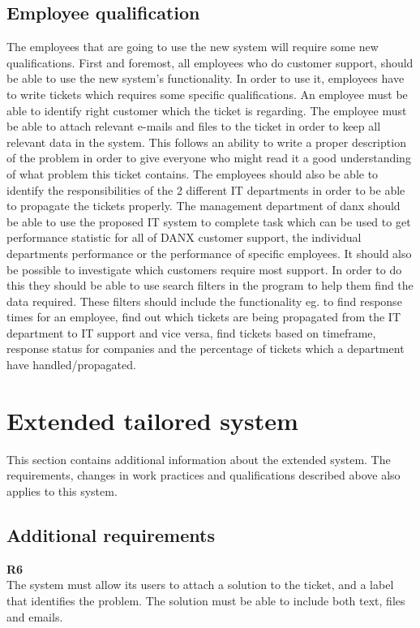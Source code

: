 \subsection{Employee qualification}
The employees that are going to use the new system will require some new qualifications. First and foremost, all employees who do customer support, should be able to use the new system's functionality. In order to use it, employees have to write tickets which requires some specific qualifications. An employee must be able to identify right customer which the ticket is regarding. The employee must be able to attach relevant e-mails and files to the ticket in order to keep all relevant data in the system. This follows an ability to write a proper description of the problem in order to give everyone who might read it a good understanding of what problem this ticket contains. The employees should also be able to identify the responsibilities of the 2 different IT departments in order to be able to propagate the tickets properly.
The management department of danx should be able to use the proposed IT system to complete task which can be used to get performance statistic for all of DANX customer support, the individual departments performance or the performance of specific employees. It should also be possible to investigate which customers require most support.
In order to do this they should be able to use search filters in the program to help them find the data required. These filters should include the functionality eg. to find response times for an employee, find out which tickets are being propagated from the IT department to IT support and vice versa, find tickets based on timeframe, response status for companies and the percentage of tickets which a department have handled/propagated.


\section{Extended tailored system}
This section contains additional information about the extended system. The requirements, changes in work practices and qualifications described above also applies to this system.
\subsection{Additional requirements}
\textbf{R6} \\
The system must allow its users to attach a solution to the ticket, and a label that identifies the problem. The solution must be able to include both text, files and emails. \\ \\

